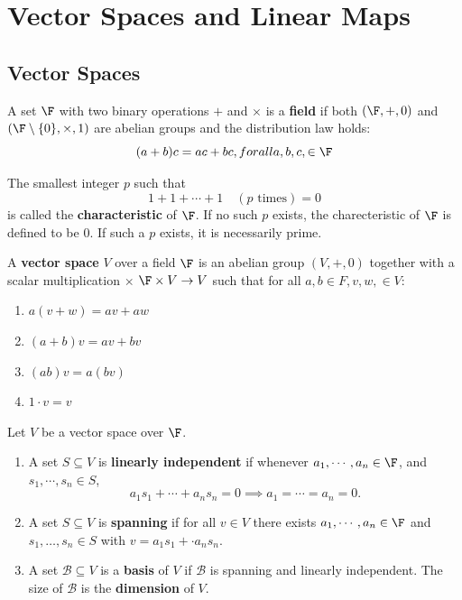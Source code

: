 \chapter{Vector Spaces and Linear Maps}

\section{Vector Spaces}
\begin{definition}
    A set $\F$ with two binary operations  $+$ and $\times$ is a \textbf{field} if both $(\F, +, 0)$ and $(\F \setminus \{0\} , \times , 1)  $ are abelian groups and the distribution law holds:
    \[
    
        (a+b)c = ac + bc, for all a, b, c, \in  \F
    \] 
\end{definition}
\begin{definition}
    The smallest integer $p$ such that
    \[
    1 + 1 + \cdots + 1 \quad (\text{$p$ times}) = 0
    \] 
    is called the \textbf{characteristic} of $\F$. If no such $p$ exists, the charecteristic of $\F$ is defined to be 0. If such a $p$ exists, it is necessarily prime.
\end{definition}
\begin{definition}
    A \textbf{vector space} $V$ over a field $\F$ is an abelian group $(V, +, 0)$ together with a scalar multiplication $\times $ $\F \times  V \to  V$ such that for all $a, b \in  F, v, w, \in  V$:
    \begin{enumerate}
        \item $a(v+w) = av + aw$        
        \item $(a+b)v = av + bv$        
        \item $(ab)v = a(bv)$
        \item $1 \cdot v = v$
    \end{enumerate}
\end{definition}
\begin{definition}
    Let $V$ be a vector space over $\F$.
    \begin{enumerate}
        \item A set $S \subseteq V $ is \textbf{linearly independent} if whenever $a_1, \cdots, a_n \in \F$, and $s_1, \cdots, s_n \in  S$,
            \[
            a_1s_1+\cdots+a_ns_n=0 \implies a_1=\cdots=a_n=0.
            \] 
        \item A set $S \subseteq V$ is \textbf{spanning} if for all $v \in  V$ there exists $a_1, \cdots, a_n \in  \F$ and $s_1, \ldots, s_n \in  S$ with $v = a_1s_1 + \cdot a_ns_n$.
        \item A set $\mathcal{B} \subseteq V$ is a \textbf{basis} of $V$ if $\mathcal{B}$ is spanning and linearly independent. The size of $\mathcal{B}$ is the \textbf{dimension} of $V$.
    \end{enumerate}
\end{definition}
